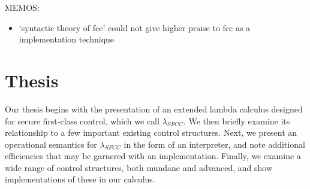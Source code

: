 \documentclass[11pt]{article}
\newcommand{\maybePage}{\newpage}
\begin{document}


%
%
%
%
%
%
%




MEMOS:
\begin{itemize}
\item `syntactic theory of fcc' could not give higher praise to fcc as a implementation technique
\end{itemize}



\maybePage
\part{Thesis}

Our thesis begins with the presentation of an extended lambda calculus designed for secure first-class control, which we call $\lambda_{SFCC}$.
We then briefly examine its relationship to a few important existing control structures.
Next, we present an operational semantics for $\lambda_{SFCC}$ in the form of an interpreter, and note additional efficiencies that may be garnered with an implementation.
Finally, we examine a wide range of control structures, both mundane and advanced, and show implementations of these in our calculus.
\end{document}
